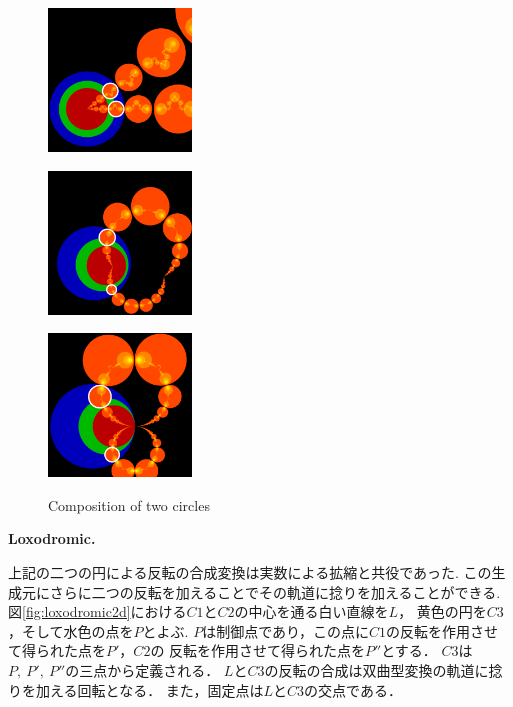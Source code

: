 \begin{figure}[htbp]
  \begin{minipage}[]{0.3\hsize}
   \center
   \includegraphics[width=1.5in, height=1.5in, keepaspectratio]{../img/klein/2diis/scalingEdged.pdf}
   \label{fig:scaling2d}
  \end{minipage}
 \hspace*{\fill}
  \begin{minipage}[]{0.3\hsize}
   \center
   \includegraphics[width=1.5in, height=1.5in, keepaspectratio]{../img/klein/2diis/hyperbolicEdged.pdf}
   \label{fig:hyperbolic2d}
  \end{minipage}
 \hspace*{\fill}
  \begin{minipage}[]{0.3\hsize}
   \center
   \includegraphics[width=1.5in, height=1.5in, keepaspectratio]{../img/klein/2diis/parabolicEdged.pdf}
   \label{fig:parabolic2d}
  \end{minipage}
  \caption{Composition of two circles}
  \label{fig:twoCircles}
\end{figure}

\noindent\textbf{Loxodromic.}

上記の二つの円による反転の合成変換は実数による拡縮と共役であった.
この生成元にさらに二つの反転を加えることでその軌道に捻りを加えることができる.
図\ref{fig:loxodromic2d}における$C1$と$C2$の中心を通る白い直線を$L$，
黄色の円を$C3$，そして水色の点を$P$とよぶ.
$P$は制御点であり，この点に$C1$の反転を作用させて得られた点を$P'$，$C2$の
反転を作用させて得られた点を$P''$とする．
$C3$は$P,~P',~P''$の三点から定義される．
$L$と$C3$の反転の合成は双曲型変換の軌道に捻りを加える回転となる．
また，固定点は$L$と$C3$の交点である．

